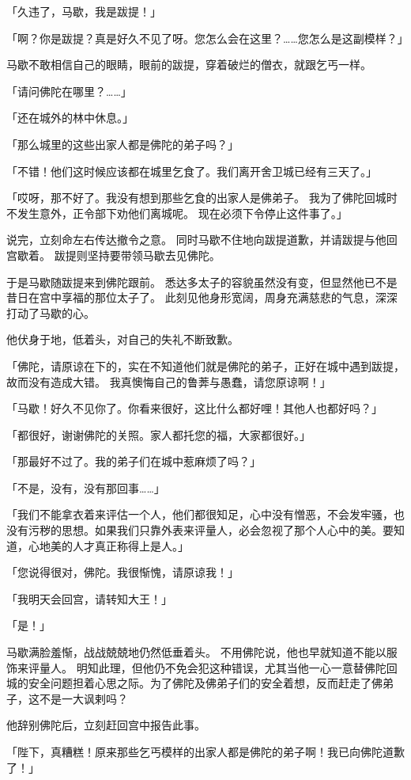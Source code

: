 \documentclass[twoside,openany]{book}
\begin{document}
「久违了，马歇，我是跋提！」

「啊？你是跋提？真是好久不见了呀。您怎么会在这里？……您怎么是这副模样？」

马歇不敢相信自己的眼睛，眼前的跋提，穿着破烂的僧衣，就跟乞丐一样。

「请问佛陀在哪里？……」

「还在城外的林中休息。」

「那么城里的这些出家人都是佛陀的弟子吗？」

「不错！他们这时候应该都在城里乞食了。我们离开舍卫城已经有三天了。」

「哎呀，那不好了。我没有想到那些乞食的出家人是佛弟子。
我为了佛陀回城时不发生意外，正令部下劝他们离城呢。
现在必须下令停止这件事了。」

说完，立刻命左右传达撤令之意。
同时马歇不住地向跋提道歉，并请跋提与他回宫歇着。
跋提则坚持要带领马歇去见佛陀。

于是马歇随跋提来到佛陀跟前。
悉达多太子的容貌虽然没有变，但显然他已不是昔日在宫中享福的那位太子了。
此刻见他身形宽阔，周身充满慈悲的气息，深深打动了马歇的心。

他伏身于地，低着头，对自己的失礼不断致歉。

「佛陀，请原谅在下的，实在不知道他们就是佛陀的弟子，正好在城中遇到跋提，故而没有造成大错。
我真懊悔自己的鲁莾与愚蠢，请您原谅啊！」

「马歇！好久不见你了。你看来很好，这比什么都好哩！其他人也都好吗？」

「都很好，谢谢佛陀的关照。家人都托您的福，大家都很好。」

「那最好不过了。我的弟子们在城中惹麻烦了吗？」

「不是，没有，没有那回事……」

「我们不能拿衣着来评估一个人，他们都很知足，心中没有憎恶，不会发牢骚，也没有污秽的思想。如果我们只靠外表来评量人，必会忽视了那个人心中的美。要知道，心地美的人才真正称得上是人。」

「您说得很对，佛陀。我很惭愧，请原谅我！」

「我明天会回宫，请转知大王！」

「是！」

马歇满脸羞惭，战战兢兢地仍然低垂着头。
不用佛陀说，他也早就知道不能以服饰来评量人。
明知此理，但他仍不免会犯这种错误，尤其当他一心一意替佛陀回城的安全问题担着心思之际。为了佛陀及佛弟子们的安全着想，反而赶走了佛弟子，这不是一大讽剌吗？

他辞别佛陀后，立刻赶回宫中报告此事。

「陛下，真糟糕！原来那些乞丐模样的出家人都是佛陀的弟子啊！我已向佛陀道歉了！」
\end{document}
